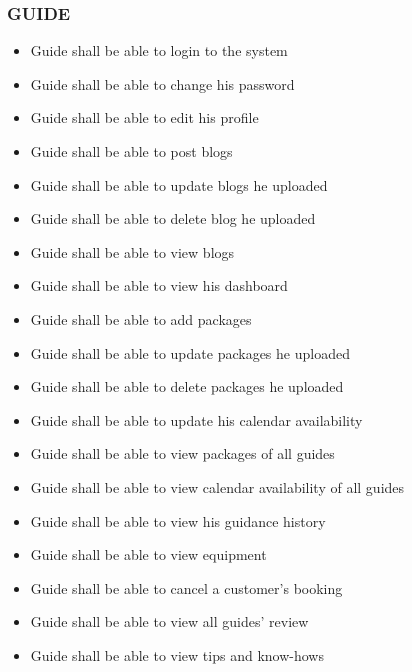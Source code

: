 \subsubsection*{GUIDE}
\begin{itemize}
\itemsep0em 
    \item Guide shall be able to login to the system
    \item Guide shall be able to change his password
    \item Guide shall be able to edit his profile
    \item Guide shall be able to post blogs
    \item Guide shall be able to update blogs he uploaded
    \item Guide shall be able to delete blog he uploaded
    \item Guide shall be able to view blogs
    \item Guide shall be able to view his dashboard
    \item Guide shall be able to add packages
    \item Guide shall be able to update packages he uploaded
    \item Guide shall be able to delete packages he uploaded
    \item Guide shall be able to update his calendar availability
    \item Guide shall be able to view packages of all guides
    \item Guide shall be able to view calendar availability of all guides
    \item Guide shall be able to view his guidance history
    \item Guide shall be able to view equipment
    \item Guide shall be able to cancel a customer’s booking
    \item Guide shall be able to view all guides’ review
    \item Guide shall be able to view tips and know-hows
\end{itemize}

